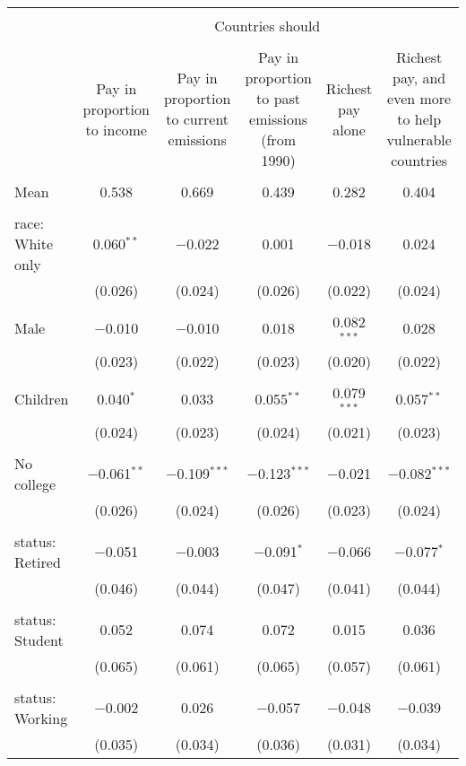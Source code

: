 
\begin{tabular}{@{\extracolsep{5pt}}lccccc} 
\\[-1.8ex]\hline 
\hline \\[-1.8ex] 
 & \multicolumn{5}{c}{Countries should} \\ 
\cline{2-6} 
\\[-1.8ex] & Pay in proportion to income & Pay in proportion to current emissions & Pay in proportion to past emissions (from 1990) & Richest pay alone & Richest pay, and even more to help vulnerable countries \\ 
\hline \\[-1.8ex] 
 Mean & 0.538 & 0.669 & 0.439 & 0.282 & 0.404  \\ \hline \\[-1.8ex] race: White only & 0.060$^{**}$ & $-$0.022 & 0.001 & $-$0.018 & 0.024 \\ 
  & (0.026) & (0.024) & (0.026) & (0.022) & (0.024) \\ 
  & & & & & \\ 
 Male & $-$0.010 & $-$0.010 & 0.018 & 0.082$^{***}$ & 0.028 \\ 
  & (0.023) & (0.022) & (0.023) & (0.020) & (0.022) \\ 
  & & & & & \\ 
 Children & 0.040$^{*}$ & 0.033 & 0.055$^{**}$ & 0.079$^{***}$ & 0.057$^{**}$ \\ 
  & (0.024) & (0.023) & (0.024) & (0.021) & (0.023) \\ 
  & & & & & \\ 
 No college & $-$0.061$^{**}$ & $-$0.109$^{***}$ & $-$0.123$^{***}$ & $-$0.021 & $-$0.082$^{***}$ \\ 
  & (0.026) & (0.024) & (0.026) & (0.023) & (0.024) \\ 
  & & & & & \\ 
 status: Retired & $-$0.051 & $-$0.003 & $-$0.091$^{*}$ & $-$0.066 & $-$0.077$^{*}$ \\ 
  & (0.046) & (0.044) & (0.047) & (0.041) & (0.044) \\ 
  & & & & & \\ 
 status: Student & 0.052 & 0.074 & 0.072 & 0.015 & 0.036 \\ 
  & (0.065) & (0.061) & (0.065) & (0.057) & (0.061) \\ 
  & & & & & \\ 
 status: Working & $-$0.002 & 0.026 & $-$0.057 & $-$0.048 & $-$0.039 \\ 
  & (0.035) & (0.034) & (0.036) & (0.031) & (0.034) \\ 

\end{tabular}
